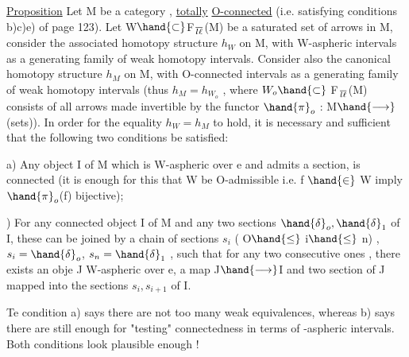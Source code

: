 
\uline{Proposition} Let M be a category ,   \uline{totally}
\uline{O-connected} (i.e. satisfying conditions  b)c)e) of page 123). Let W$\hand{\subset}$F$\over{l}{\ell}$(M)
be a saturated set of arrows in M, consider the associated homotopy
structure $h_W$ on M, with W-aspheric intervals as a generating family of
weak homotopy intervals. Consider also the canonical homotopy structure
 $h_M$ on M, with O-connected intervals as a generating family of weak
homotopy intervals (thus $h_M = h_{W_o}$ , where $W_o \hand{\subset}$ F$\over{l}{\ell}$(M) consists of all
arrows made invertible by the functor $\hand{\pi}_o$ : M$\hand{\longrightarrow}$(sets)). In order for the
equality $h_W = h_M$ to hold, it is necessary and sufficient that the
following two conditions be satisfied:

a) Any object  I of M which is W-aspheric over e and admits a
section, is connected (it is enough for this that W be O-admissible i.e.
f $\hand{\in}$ W imply $\hand{\pi}_o$(f) bijective);

) For any connected object I of M and any two sections $\hand{\delta}_o,\hand{\delta}_1$ of I,
these can be joined by a  chain of sections $s_i$ ( O$\hand{\leq}$ i$\hand{\leq}$ n) , $s_i = \hand{\delta}_o$,
$s_n = \hand{\delta}_1$ , such that for any two consecutive ones , there exists an obje
J  W-aspheric over e, a map J$\hand{\longrightarrow}$I and two section of J mapped
into the sections $s_i,s_{i+1}$ of I.

Te condition a) says there are not too many weak equivalences, 
whereas b) says there are still enough for "testing" connectedness in
terms of -aspheric intervals. Both conditions look plausible enough !

